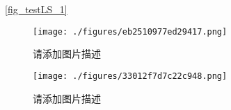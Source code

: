 
\autoref{fig_testLS_1}~




\begin{figure}[ht]
\centering
\texttt{[image: ./figures/eb2510977ed29417.png]}
\caption{请添加图片描述} \label{fig_testcd_1}
\end{figure}

\begin{figure}[ht]
\centering
\texttt{[image: ./figures/33012f7d7c22c948.png]}
\caption{请添加图片描述} \label{fig_testcd_2}
\end{figure}